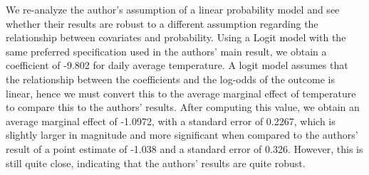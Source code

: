 \documentclass{article}
\begin{document}
	We re-analyze the author's assumption of a linear probability model and see whether their results are robust to a different assumption regarding the relationship between covariates and probability. Using a Logit model with the same preferred specification used in the authors' main result, we obtain a coefficient of -9.802 for daily average temperature. A logit model assumes that the relationship between the coefficients and the log-odds of the outcome is linear, hence we must convert this to the average marginal effect of temperature to compare this to the authors' results. After computing this value, we obtain an average marginal effect of -1.0972, with a standard error of 0.2267, which is slightly larger in magnitude and more significant when compared to the authors' result of a point estimate of -1.038 and a standard error of 0.326. However, this is still quite close, indicating that the authors' results are quite robust.
	
	






	
\end{document}
